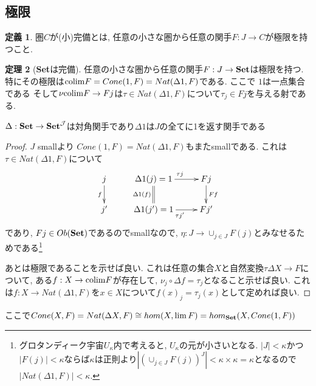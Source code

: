 \documentclass[dvipdfmx,a4paper,11pt]{report}
\newcommand{\colim}{{\rm colim}}
\theoremstyle{definition}
\newtheorem{thm}{定理}
\newtheorem{dfn}[thm]{定義}
\begin{document}
\subsection{極限}
 \begin{tcolorbox}
 [colback = white, colframe = green!35!black, fonttitle = \bfseries,breakable = true]
\begin{dfn}
圏$C$が(小)完備とは, 任意の小さな圏から任意の関手$F: J \to C$が極限を持つこと. 
\end{dfn}
\end{tcolorbox}

 \begin{tcolorbox}
 [colback = white, colframe = green!35!black, fonttitle = \bfseries,breakable = true]
\begin{thm}[{\bf Set}は完備]
\label{thm-set-complete}
任意の小さな圏から任意の関手$F: J \to {\bf Set}$は極限を持つ. 
特にその極限は$\colim F = Cone(1 , F)=Nat(\Delta 1, F)$である. ここで $1$は一点集合である
そして$\nu \colim  F \to F j$は$ \tau \in Nat(\Delta 1, F)$について$\tau_j \in Fj$を与える射である. 
\end{thm}
\end{tcolorbox}
$\Delta : {\bf Set}\to {\bf Set}^{\mathcal{J}}$は対角関手であり$\Delta 1$は$J$の全てに1を返す関手である

\begin{proof}
$J$ smallより
$Cone(1 , F)=Nat(\Delta 1, F)$もまたsmallである. 
これは$\tau \in Nat(\Delta 1, F)$について
\begin{equation*}
\xymatrix@C=25pt@R=20pt{
j\ar@{->}[d]_{f}&\Delta 1(j)=1\ar@{=}[d]_{\Delta 1(f)}  \ar@{->}[r]^{\tau j} & Fj\ar@{->}[d]^{Ff} \\
j'&\Delta 1(j')=1\ar@{->}[r]_{\tau j'} & Fj'\\   
}
\end{equation*}
であり, $Fj \in Ob({\bf Set })$であるのでsmallなので, $\eta : J \to \cup_{j \in J} F(j)$とみなせるためである\footnote{グロタンディーク宇宙$U_{\kappa}$内で考えると, $U_{\kappa}$の元が小さいとなる. $|J| < \kappa$かつ$|F(j)| < \kappa$ならば$\kappa$は正則より$|(\cup_{j \in J} F(j))^{J}| < \kappa \times \kappa = \kappa$となるので$|Nat(\Delta 1, F)|< \kappa$.}

あとは極限であることを示せば良い. これは任意の集合$X$と自然変換$ \tau  \Delta X \to F$について, 
ある$f : X \to \colim F $が存在して, $\nu_{j} \circ \Delta f  = \tau_j$となること示せば良い.
これは$ f : X \to Nat(\Delta 1, F)$を$x \in X$について$f(x)_j = \tau_{j}(x)$として定めれば良い. 
\end{proof}
ここで$Cone(X,F) = Nat(\Delta X , F) \cong hom(X, \lim F) = hom_{{\bf Set}} (X, Cone(1,F))$
\end{document}
